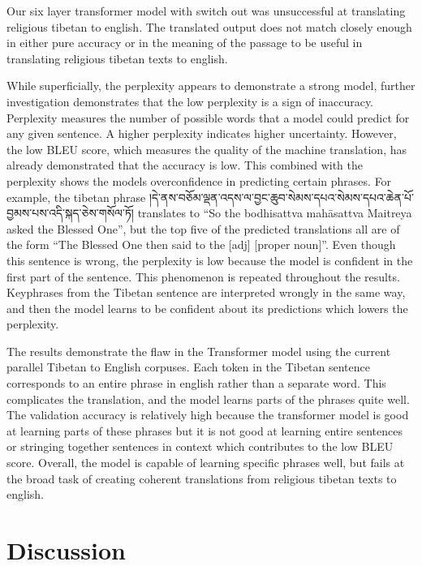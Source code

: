 \documentclass[letterpaper, 10 pt, conference]{ieeeconf}  %
\begin{document}
\par
Our six layer transformer model with switch out was unsuccessful at translating religious tibetan to english. The translated output does not match closely enough in either pure accuracy or in the meaning of the passage to be useful in translating religious tibetan texts to english. \par
While superficially, the perplexity appears to demonstrate a strong model, further investigation demonstrates that the low perplexity is a sign of inaccuracy. Perplexity measures the number of possible words that a model could predict for any given sentence. A higher perplexity indicates higher uncertainty. However, the low BLEU score, which measures the quality of the machine translation, has already demonstrated that the accuracy is low. This combined with the perplexity shows the models overconfidence in predicting certain phrases. For example, the tibetan phrase །དེ་ནས་བཅོམ་ལྡན་འདས་ལ་བྱང་ཆུབ་སེམས་དཔའ་སེམས་དཔའ་ཆེན་པོ་བྱམས་པས་འདི་སྐད་ཅེས་གསོལ་ཏོ། translates to “So the bodhisattva mahāsattva Maitreya asked the Blessed One”, but the top five of the predicted translations all are of the form “The Blessed One then said to the [adj] [proper noun]”. Even though this sentence is wrong, the perplexity is low because the model is confident in the first part of the sentence. This phenomenon is repeated throughout the results. Keyphrases from the Tibetan sentence are interpreted wrongly in the same way, and then the model learns to be confident about its predictions which lowers the perplexity. \par
The results demonstrate the flaw in the Transformer model using the current parallel Tibetan to English corpuses. Each token in the Tibetan sentence corresponds to an entire phrase in english rather than a separate word. This complicates the translation, and the model learns parts of the phrases quite well. The validation accuracy is relatively high because the transformer model is good at learning parts of these phrases but it is not good at learning entire sentences or stringing together sentences in context which contributes to the low BLEU score. Overall, the model is capable of learning specific phrases well, but fails at the broad task of creating coherent translations from religious tibetan texts to english.


\section{Discussion}
\end{document}
